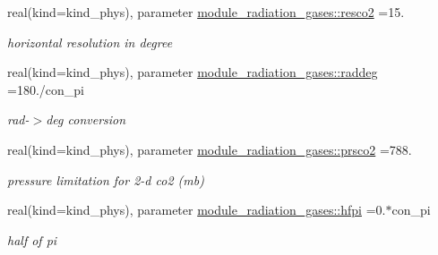 \begin{DoxyCompactItemize}
real(kind=kind\+\_\+phys), parameter \hyperlink{group__module__radiation__gases_gafda5c1d1129d865b9772e0f58dea7598}{module\+\_\+radiation\+\_\+gases\+::resco2} =15.
\begin{DoxyCompactList}\small\item\em horizontal resolution in degree \end{DoxyCompactList}\item 
\mbox{\label{group__module__radiation__gases_gaa5873ae54e950001ff873771378e7a1e}} 
real(kind=kind\+\_\+phys), parameter \hyperlink{group__module__radiation__gases_gaa5873ae54e950001ff873771378e7a1e}{module\+\_\+radiation\+\_\+gases\+::raddeg} =180./con\+\_\+pi
\begin{DoxyCompactList}\small\item\em rad-\/$>$deg conversion \end{DoxyCompactList}\item 
\mbox{\label{group__module__radiation__gases_gab09dc05b8a02e9a0b56991508b599708}} 
real(kind=kind\+\_\+phys), parameter \hyperlink{group__module__radiation__gases_gab09dc05b8a02e9a0b56991508b599708}{module\+\_\+radiation\+\_\+gases\+::prsco2} =788.
\begin{DoxyCompactList}\small\item\em pressure limitation for 2-\/d co2 (mb) \end{DoxyCompactList}\item 
\mbox{\label{group__module__radiation__gases_gab99c75954c59ed92a52de94ca6113f73}} 
real(kind=kind\+\_\+phys), parameter \hyperlink{group__module__radiation__gases_gab99c75954c59ed92a52de94ca6113f73}{module\+\_\+radiation\+\_\+gases\+::hfpi} =0.$\ast$con\+\_\+pi
\begin{DoxyCompactList}\small\item\em half of pi \end{DoxyCompactList}\end{DoxyCompactItemize}
